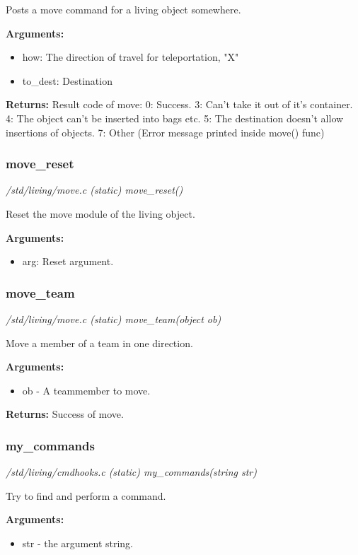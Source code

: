 Posts a move command for a living object somewhere.

{\bf Arguments:}
\begin{itemize}
\item     how:      The direction of travel for teleportation, "X"
\item to\_dest:  Destination
\end{itemize}

{\bf Returns:}        Result code of move:
0: Success.
3: Can't take it out of it's container.
4: The object can't be inserted into bags etc.
5: The destination doesn't allow insertions of objects.
7: Other (Error message printed inside move() func)


\subsubsection{move\_reset}

{\em /std/living/move.c (static) move\_reset()}

Reset the move module of the living object.

{\bf Arguments:}
\begin{itemize}
\item     arg: Reset argument.
\end{itemize}


\subsubsection{move\_team}

{\em /std/living/move.c (static) move\_team(object ob)}

Move a member of a team in one direction.

{\bf Arguments:}
\begin{itemize}
\item      ob - A teammember to move.
\end{itemize}

{\bf Returns:}        Success of move.


\subsubsection{my\_commands}

{\em /std/living/cmdhooks.c (static) my\_commands(string str)}

Try to find and perform a command.

{\bf Arguments:}
\begin{itemize}
\item      str - the argument string.
\end{itemize}



